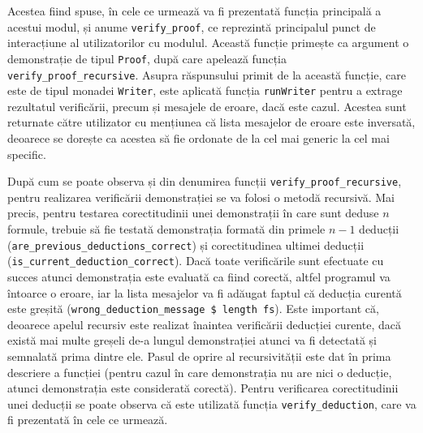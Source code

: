 \documentclass[12pt, openany]{book}
\begin{document}
            \par{}
                Acestea fiind spuse, în cele ce urmează va fi prezentată funcția principală a acestui modul, și anume 
                \texttt{verify\_proof}, ce reprezintă principalul punct de interacțiune al utilizatorilor cu modulul. 
                Această funcție primește ca argument o demonstrație de tipul \texttt{Proof}, după care apelează funcția 
                \texttt{verify\_proof\_recursive}. Asupra răspunsului primit de la această funcție, care este de tipul 
                monadei \texttt{Writer}, este aplicată funcția \texttt{runWriter} pentru a extrage rezultatul 
                verificării, precum și mesajele de eroare, dacă este cazul. Acestea sunt returnate către utilizator cu 
                mențiunea că lista mesajelor de eroare este inversată, deoarece se dorește ca acestea să fie ordonate de 
                la cel mai generic la cel mai specific. 
            
            \par{}
                După cum se poate observa și din denumirea funcții \texttt{verify\_proof\_recursive}, pentru realizarea 
                verificării demonstrației se va folosi o metodă recursivă. Mai precis, pentru testarea corectitudinii 
                unei demonstrații în care sunt deduse $n$ formule, trebuie să fie testată demonstrația formată din 
                primele $n-1$ deducții (\texttt{are\_previous\_deductions\_correct}) și corectitudinea ultimei deducții 
                (\texttt{is\_current\_deduction\_correct}). Dacă toate verificările sunt efectuate cu succes atunci 
                demonstrația este evaluată ca fiind corectă, altfel programul va întoarce o eroare, iar la lista
                mesajelor va fi adăugat faptul că deducția curentă este greșită (\texttt{wrong\_deduction\_message \$ 
                length fs}). Este important că, deoarece apelul recursiv este realizat înaintea verificării deducției 
                curente, dacă există mai multe greșeli de-a lungul demonstrației atunci va fi detectată și semnalată 
                prima dintre ele. Pasul de oprire al recursivității este dat în prima descriere a funcției (pentru 
                cazul în care demonstrația nu are nici o deducție, atunci demonstrația este considerată corectă). Pentru 
                verificarea corectitudinii unei deducții se poate observa că este utilizată funcția 
                \texttt{verify\_deduction}, care va fi prezentată în cele ce urmează.
\end{document}
